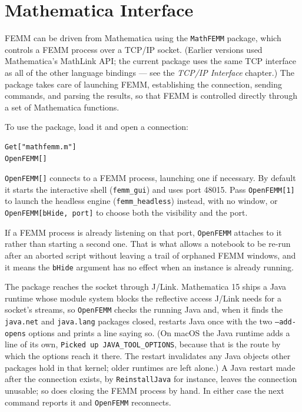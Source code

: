 \chapter{Mathematica Interface}

FEMM can be driven from Mathematica using the {\tt MathFEMM} package, which
controls a FEMM process over a TCP/IP socket.  (Earlier versions used
Mathematica's MathLink API; the current package uses the same TCP interface as
all of the other language bindings --- see the {\em TCP/IP Interface} chapter.)
The package takes care of launching FEMM, establishing the connection, sending
commands, and parsing the results, so that FEMM is controlled directly through a
set of Mathematica functions.

To use the package, load it and open a connection:

\begin{verbatim}
Get["mathfemm.m"]
OpenFEMM[]
\end{verbatim}

\verb+OpenFEMM[]+ connects to a FEMM process, launching one if necessary.  By
default it starts the interactive shell ({\tt femm\_gui}) and uses port 48015.
Pass \verb+OpenFEMM[1]+ to launch the headless engine ({\tt femm\_headless})
instead, with no window, or \verb+OpenFEMM[bHide, port]+ to choose both the
visibility and the port.

If a FEMM process is already listening on that port, {\tt OpenFEMM} attaches to
it rather than starting a second one.  That is what allows a notebook to be
re-run after an aborted script without leaving a trail of orphaned FEMM
windows, and it means the {\tt bHide} argument has no effect when an instance
is already running.

The package reaches the socket through J/Link.  Mathematica 15 ships a Java
runtime whose module system blocks the reflective access J/Link needs for a
socket's streams, so {\tt OpenFEMM} checks the running Java and, when it finds
the {\tt java.net} and {\tt java.lang} packages closed, restarts Java once with
the two {\tt --add-opens} options and prints a line saying so.  (On macOS the
Java runtime adds a line of its own, {\tt Picked up JAVA\_TOOL\_OPTIONS}, because
that is the route by which the options reach it there.  The restart
invalidates any Java objects other packages hold in that kernel; older
runtimes are left alone.)  A Java restart made after the connection exists,
by {\tt ReinstallJava} for instance, leaves the connection unusable; so does
closing the FEMM process by hand.  In either case the next command reports
it and {\tt OpenFEMM} reconnects.

